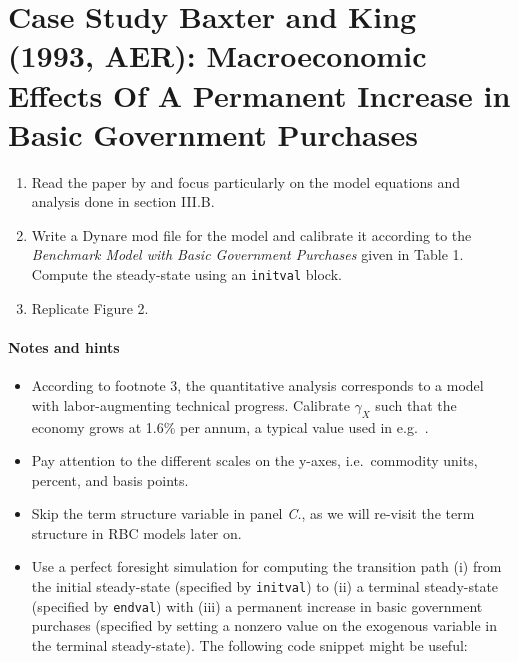 \section[Case Study Baxter and King (1993, AER): Macroeconomic Effects Of A Permanent Increase in Basic Government Purchases]{Case Study Baxter and King (1993, AER): Macroeconomic Effects Of A Permanent Increase in Basic Government Purchases\label{ex:CaseStudy.BaxterKing.Figure2}}

\begin{enumerate}

\item
Read the paper by \textcite{Baxter.King_1993_FiscalPolicyGeneral}
  and focus particularly on the model equations and analysis done in section III.B.

\item
Write a Dynare mod file for the model
  and calibrate it according to the \emph{Benchmark Model with Basic Government Purchases} given in Table 1.
Compute the steady-state using an \texttt{initval} block.

\item Replicate Figure 2.

\end{enumerate}

\paragraph{Notes and hints}

\begin{itemize}
\item
According to footnote 3, the quantitative analysis corresponds to a model with labor-augmenting technical progress.
Calibrate \(\gamma_X\) such that the economy grows at 1.6\% per annum,
  a typical value used in e.g.\ \textcite{King.Plosser.Rebelo_1988_ProductionGrowthBusiness}.

\item
Pay attention to the different scales on the y-axes, i.e.\ commodity units, percent, and basis points.

\item
Skip the term structure variable in panel \emph{C.}, as we will re-visit the term structure in RBC models later on.

\item Use a perfect foresight simulation for computing the transition path
  (i) from the initial steady-state (specified by \texttt{initval}) to
  (ii) a terminal steady-state (specified by \texttt{endval}) with
  (iii) a permanent increase in basic government purchases (specified by setting a nonzero value on the exogenous variable in the terminal steady-state).
The following code snippet might be useful:

\end{itemize}

